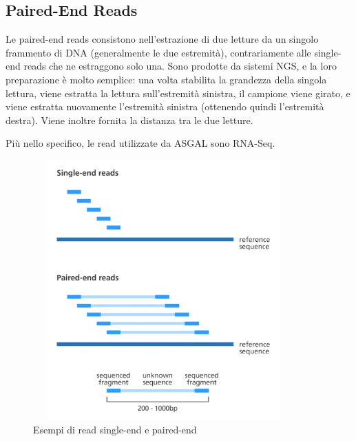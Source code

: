\subsection{Paired-End Reads}
Le paired-end reads consistono nell'estrazione di due letture da un singolo frammento di DNA (generalmente le due estremità), contrariamente alle single-end reads che ne estraggono solo una. Sono prodotte da sistemi NGS, e la loro preparazione è molto semplice: una volta stabilita la grandezza della singola lettura, viene estratta la lettura sull'estremità sinistra, il campione viene girato, e viene estratta nuovamente l'estremità sinistra (ottenendo quindi l'estremità destra). Viene inoltre fornita la distanza tra le due letture.

Più nello specifico, le read utilizzate da ASGAL sono RNA-Seq.

\begin{figure}[h!]
	\centering
	\includegraphics[height=10cm,width=10cm]{images/pairedendreads.png}
  \caption{Esempi di read single-end e paired-end}
  \label{fig:PairedEndReads}
\end{figure}